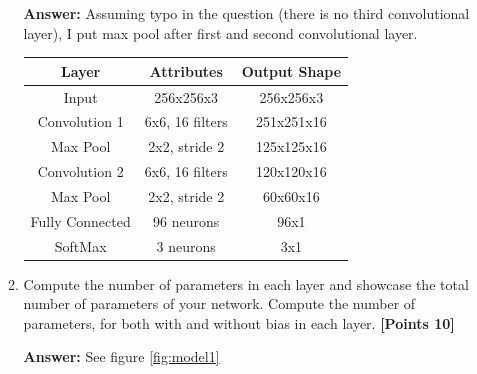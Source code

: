 \documentclass[12pt]{article}
\begin{document}
\begin{enumerate}
\begin{enumerate}
                    \textbf{Answer:}
                    Assuming typo in the question (there is no third
                    convolutional layer), I put max pool after first and
                    second convolutional layer.
                    \begin{table}[h]
                        \centering
                        \begin{tabular}{|ccc|}
                            \hline
                            \textbf{Layer}  & \textbf{Attributes} & \textbf{Output Shape} \\
                            \hline
                            Input           & 256x256x3           & 256x256x3             \\
                            \hline
                            Convolution 1   & 6x6, 16 filters     & 251x251x16            \\
                            \hline
                            Max Pool        & 2x2, stride 2       & 125x125x16            \\
                            \hline
                            Convolution 2   & 6x6, 16 filters     & 120x120x16            \\
                            \hline
                            Max Pool        & 2x2, stride 2       & 60x60x16              \\
                            \hline
                            Fully Connected & 96 neurons          & 96x1                  \\
                            \hline
                            SoftMax         & 3 neurons           & 3x1                   \\
                            \hline
                        \end{tabular}
                    \end{table}
              \item Compute the number of parameters in each layer and
                    showcase the total number of parameters of your network.
                    Compute the number of parameters, for both with and
                    without bias in each layer. \textbf{[Points 10]}

                    \textbf{Answer:}
                    See figure \ref{fig:model1}


\end{enumerate}
\end{enumerate}
\end{document}

